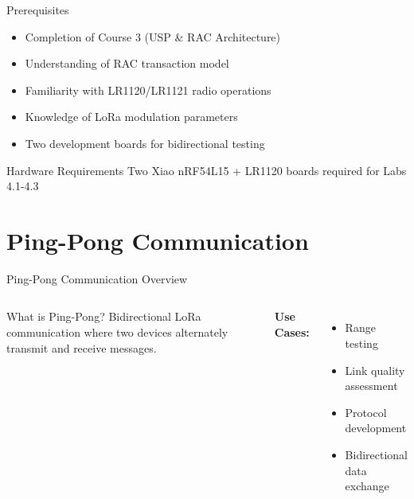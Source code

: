 \documentclass{beamer}
\begin{document}
\begin{frame}{Prerequisites}
\begin{itemize}
    \item Completion of Course 3 (USP \& RAC Architecture)
    \item Understanding of RAC transaction model
    \item Familiarity with LR1120/LR1121 radio operations
    \item Knowledge of LoRa modulation parameters
    \item Two development boards for bidirectional testing
\end{itemize}

\vspace{0.5cm}

\begin{alertblock}{Hardware Requirements}
Two Xiao nRF54L15 + LR1120 boards required for Labs 4.1-4.3
\end{alertblock}
\end{frame}

\section{Ping-Pong Communication}

\begin{frame}{Ping-Pong Communication Overview}
\begin{columns}
\begin{block}{What is Ping-Pong?}
Bidirectional LoRa communication where two devices alternately transmit and receive messages.
\end{block}

\vspace{0.3cm}

\textbf{Use Cases:}
\begin{itemize}
    \item Range testing
    \item Link quality assessment
    \item Protocol development
    \item Bidirectional data exchange
\end{itemize}

\end{columns}
\end{frame}
\end{document}
